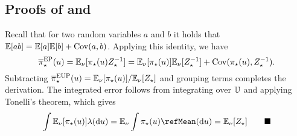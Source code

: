 \documentclass[12pt]{article}
\begin{document}
\subsection{Proofs of  and }
Recall that for two random variables $a$ and $b$ it holds that $\mathbb{E}[ab] = \mathbb{E}[a]\mathbb{E}[b] + \mathrm{Cov}(a,b)$.
Applying this identity, we have
\begin{equation*}
{\overline{\pi}}_{\star}^{\mathrm{EP}}(u)
= \mathbb{E}_{\nu}[{\pi}_{\star}(u) {Z}_{\star}^{-1}]
= \mathbb{E}_{\nu}[{\pi}_{\star}(u)] \mathbb{E}_{\nu}[{Z}_{\star}^{-1}] + \mathrm{Cov}({\pi}_{\star}(u), {Z}_{\star}^{-1}).
\end{equation*} 
Subtracting ${\overline{\pi}}_{\star}^{\mathrm{EUP}}(u) = \mathbb{E}_{\nu}[{\pi}_{\star}(u)] / \mathbb{E}_{\nu}[{Z}_{\star}]$
and grouping terms completes the derivation. The integrated error follows from integrating 
over $\mathbb{U}$ and applying Tonelli's theorem, which gives
\begin{equation*}
\int \emE[\postEm(\Par)] \refMeas(\d\Par) = \emE \int \postEm(\Par) \refMean(\d\Par) = \emE[\normCstEm]
\qquad \blacksquare
\end{equation*} 
 
 
% 
\end{document}
